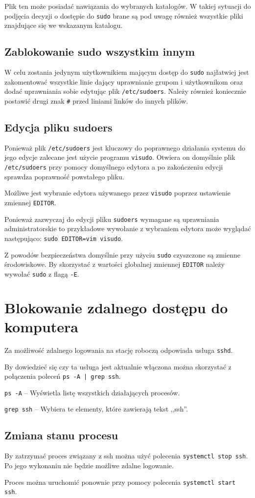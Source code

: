 \documentclass{article}
\begin{document}
Plik ten może posiadać nawiązania do wybranych katalogów. W takiej sytuacji do podjęcia decyzji o dostępie do \texttt{sudo} brane są pod uwagę również wszystkie pliki znajdujące się we wskazanym katalogu.

\subsection{Zablokowanie sudo wszystkim innym}
W celu zostania jedynym użytkownikiem mającym dostęp do \texttt{sudo} najłatwiej jest zakomentować wszystkie linie dający uprawnianie grupom i użytkownikom oraz dodać uprawniania sobie edytując plik \texttt{/etc/sudoers}. Należy również koniecznie postawić drugi znak \texttt{\#} przed liniami linków do innych plików.

\subsection{Edycja pliku sudoers}
Ponieważ plik \texttt{/etc/sudoers} jest kluczowy do poprawnego działania systemu do jego edycje zalecane jest użycie programu \texttt{visudo}. Otwiera on domyślnie plik \texttt{/etc/sudoers} przy pomocy domyślnego edytora a po zakończeniu edycji sprawdza poprawność powstałego pliku.

Możliwe jest wybranie edytora używanego przez \texttt{visudo} poprzez ustawienie zmiennej \texttt{EDITOR}. \par{}
Ponieważ zazwyczaj do edycji pliku \texttt{sudoers} wymagane są uprawniania administratorskie to przykładowe wywołanie z wybraniem edytora może wyglądać następująco: \texttt{sudo EDITOR=vim visudo}.

Z powodów bezpieczeństwa domyślnie przy użyciu \texttt{sudo} czyszczone są zmienne środowiskowe. By skorzystać z wartości globalnej zmiennej \texttt{EDITOR} należy wywołać \texttt{sudo}  z flagą \texttt{-E}.

\section{Blokowanie zdalnego dostępu do komputera}
Za możliwość zdalnego logowania na stację roboczą odpowiada usługa \texttt{sshd}.

By dowiedzieć się czy ta usługa jest aktualnie włączona można skorzystać z połączenia poleceń \texttt{ps -A | grep ssh}. \par{}
\texttt{ps -A} -- Wyświetla listę wszystkich działających procesów. \par{}
\texttt{grep ssh} -- Wybiera te elementy, które zawierają tekst ,,ssh''.

\subsection{Zmiana stanu procesu}
By zatrzymać proces związany z ssh można użyć polecenia \texttt{systemctl stop ssh}. Po jego wykonaniu nie będzie możliwe zdalne logowanie.

Proces można uruchomić ponownie przy pomocy polecenia \texttt{systemctl start ssh}.
\end{document}
